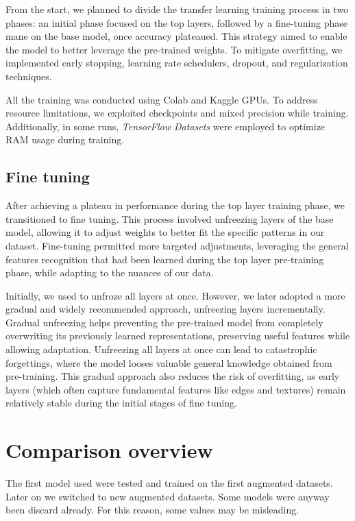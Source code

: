 \documentclass[11pt]{article}
\begin{document}
From the start, we planned to divide the transfer learning training process in two phases: an initial phase focused on the top layers, followed by a fine-tuning phase mane on the base model, once accuracy plateaued.
This strategy aimed to enable the model to better leverage the pre-trained weights. 
To mitigate overfitting, we implemented early stopping, learning rate schedulers, dropout, and regularization techniques.

All the training was conducted using Colab and Kaggle GPUs.
To address resource limitations, we exploited checkpoints and mixed precision while training. Additionally, in some runs, \textit{TensorFlow Datasets} were employed to optimize RAM usage during training.

\subsection{Fine tuning}

After achieving a plateau in performance during the top layer training phase, we transitioned to fine tuning. 
This process involved unfreezing layers of the base model, allowing it to adjust weights to better fit the specific patterns in our dataset. 
Fine-tuning permitted more targeted adjustments, leveraging the general features recognition that had been learned during the top layer pre-training phase, while adapting to the nuances of our data.

Initially, we used to unfroze all layers at once. 
However, we later adopted a more gradual and widely recommended approach, unfreezing layers incrementally. 
Gradual unfreezing helps preventing the pre-trained model from completely overwriting its previously learned representations, preserving useful features while allowing adaptation. Unfreezing all layers at once can lead to catastrophic forgettings, where the model looses valuable general knowledge obtained from pre-training.
This gradual approach also reduces the risk of overfitting, as early layers (which often capture fundamental features like edges and textures) remain relatively stable during the initial stages of fine tuning.

\section{Comparison overview}

The first model used were tested and trained on the first augmented datasets.
Later on we switched to new augmented datasets. Some models were anyway been discard already. 
For this reason, some values may be misleading.
\end{document}
